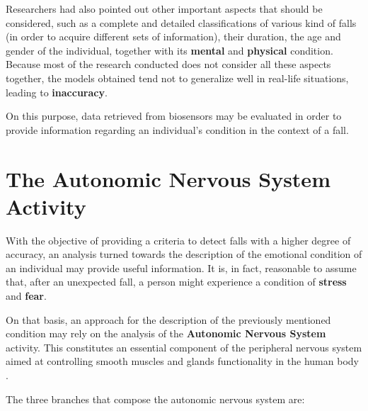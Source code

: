 
Researchers had also pointed out other important aspects that should be considered, such as a complete and detailed classifications of various kind of falls (in order to acquire different sets of information), their duration, the age and gender of the individual, together with its \textbf{mental} and \textbf{physical} condition.
Because most of the research conducted does not consider all these aspects together, the models obtained tend not to generalize well in real-life situations, leading to \textbf{inaccuracy}.

On this purpose, data retrieved from biosensors may be evaluated in order to provide information regarding an individual's condition in the context of a fall.

\section{The Autonomic Nervous System Activity}\label{sec:edaintro}

With the objective of providing a criteria to detect falls with a higher degree of accuracy, an analysis turned towards the description of the emotional condition of an individual may provide useful information. It is, in fact, reasonable to assume that, after an unexpected fall, a person might experience a condition of \textbf{stress} and \textbf{fear}.

On that basis, an approach for the description of the previously mentioned condition may rely on the analysis of the \textbf{Autonomic Nervous System} activity. This constitutes an essential component of the peripheral nervous system aimed at controlling smooth muscles and glands functionality in the human body \cite{ansWiki}.

The three branches that compose the autonomic nervous system are:

